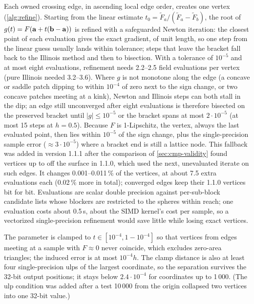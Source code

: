 Each owned crossing edge, in ascending local edge order, creates one vertex
(\cref{alg:refine}). Starting from the linear estimate $t_0 = \tilde F_a/(\tilde F_a - \tilde F_b)$,
the root of $g(t) = F(\mathbf{a} + t(\mathbf{b} - \mathbf{a}))$ is refined with a
safeguarded Newton iteration: the closest point of each evaluation gives
the exact gradient, of unit length, so one step from the linear guess
usually lands within tolerance; steps that leave the bracket fall back to
the Illinois method and then to bisection. With a tolerance of
$10^{-5}$\Ang{} and at most eight evaluations, refinement needs 2.2--2.5
field evaluations per vertex (pure Illinois needed 3.2--3.6). Where $g$ is
not monotone along the edge (a concave or saddle patch dipping to within
$10^{-4}$\Ang{} of zero next to the sign change, or two concave patches
meeting at a kink), Newton and Illinois steps can both stall in the dip; an
edge still unconverged after eight evaluations is therefore bisected on the
preserved bracket until $|g| \le 10^{-5}$\Ang{} or the bracket spans at
most $2\cdot10^{-5}$\Ang{} (at most 15 steps at $h = 0.5$\Ang). Because $F$
is 1-Lipschitz, the vertex, always the last evaluated point, then lies
within $10^{-5}$\Ang{} of the sign change, plus the single-precision sample
error ($\approx 3\cdot10^{-5}$\Ang) where a bracket end is still a lattice
node. This fallback was added in version 1.1.1 after the comparison of
\cref{sec:cmp-validity} found vertices up to
\Ang{} off the surface in 1.1.0, which used the
next, unevaluated iterate on such edges. It changes 0.001--0.011\,\% of the
vertices, at about 7.5 extra evaluations each (0.02\,\% more in total);
converged edges keep their 1.1.0 vertices bit for bit. Evaluations
are scalar double precision against per-sub-block candidate lists whose
blockers are restricted to the spheres within reach; one evaluation costs
about 0.5\,\textmu s, about the SIMD kernel's cost per sample, so a
vectorized single-precision refinement would save little while losing
exact vertices.

The parameter is clamped to $t \in [10^{-4}, 1 - 10^{-4}]$ so that
vertices from edges meeting at a sample with $F \approx 0$ never coincide,
which excludes zero-area triangles; the induced error is at most
$10^{-4}h$. The clamp distance is also at least four single-precision ulps
of the largest coordinate, so the separation survives the 32-bit output
positions; it stays below $2.4\cdot10^{-4}$\Ang{} for coordinates up to
1\,000\Ang. (The ulp condition was added after a test 10\,000\Ang{} from
the origin collapsed two vertices into one 32-bit value.)

